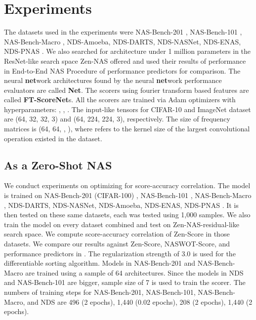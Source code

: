 \documentclass[lettersize,journal]{IEEEtran}
\begin{document}
\section{Experiments} \label{sec:experiment}
The datasets used in the experiments were NAS-Bench-201 \cite{nb201}, NAS-Bench-101 \cite{nb101}, NAS-Bench-Macro \cite{macro}, NDS-Amoeba, NDS-DARTS, NDS-NASNet, NDS-ENAS, NDS-PNAS \cite{nds}. We also searched for architecture under 1 million parameters in the ResNet-like search space Zen-NAS \cite{Zen-NAS} offered and used their results of performance in End-to-End NAS Procedure of performance predictors for comparison. The neural \textbf{net}work architectures found by the neural \textbf{net}work performance evaluators are called \textbf{Net}. The scorers using fourier transform based features are called \textbf{FT-ScoreNet}s. All the scorers are trained via Adam optimizers with hyperparameters: , , . The input-like tensors for CIFAR-10 and ImageNet dataset are (64, 32, 32, 3) and (64, 224, 224, 3), respectively. The size of frequency matrices is (64, 64, , ), where  refers to the kernel size of the largest convolutional operation existed in the dataset.

    \subsection{As a Zero-Shot NAS}
        We conduct experiments on optimizing for score-accuracy correlation. The model is trained on NAS-Bench-201 (CIFAR-100) \cite{nb201}, NAS-Bench-101 \cite{nb101}, NAS-Bench-Macro \cite{macro}, NDS-DARTS, NDS-NASNet, NDS-Amoeba, NDS-ENAS, NDS-PNAS \cite{nds}. It is then tested on these same datasets, each was tested using 1,000 samples. We also train the model on every dataset combined and test on Zen-NAS-residual-like search space. We compute score-accuracy correlation of Zen-Score in those datasets. We compare our results against Zen-Score, NASWOT-Score, and performance predictors in \cite{LightweightNAS}. The regularization strength of 3.0 is used for the differentiable sorting algorithm. Models in NAS-Bench-201 and NAS-Bench-Macro are trained using a sample of 64 architectures. Since the models in NDS and NAS-Bench-101 are bigger, sample size of 7 is used to train the scorer. The numbers of training steps for NAS-Bench-201, NAS-Bench-101, NAS-Bench-Macro, and NDS are 496 (2 epochs), 1,440 (0.02 epochs), 208 (2 epochs), 1,440 (2 epochs).
\end{document}
